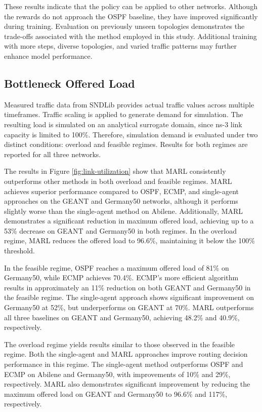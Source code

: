 These results indicate that the policy can be applied to other networks. Although the rewards do not approach the OSPF baseline, they have improved significantly during training. Evaluation on previously unseen topologies demonstrates the trade-offs associated with the method employed in this study. Additional training with more steps, diverse topologies, and varied traffic patterns may further enhance model performance.

\subsection{Bottleneck Offered Load}
\label{sec:res-util}

Measured traffic data from SNDLib \cite{SNDlib10} provides actual traffic values across multiple timeframes. Traffic scaling is applied to generate demand for simulation. The resulting load is simulated on an analytical surrogate domain, since ns-3 link capacity is limited to 100\%. Therefore, simulation demand is evaluated under two distinct conditions: overload and feasible regimes. Results for both regimes are reported for all three networks.

The results in Figure \ref{fig:link-utilization} show that MARL consistently outperforms other methods in both overload and feasible regimes. MARL achieves superior performance compared to OSPF, ECMP, and single-agent approaches on the GEANT and Germany50 networks, although it performs slightly worse than the single-agent method on Abilene. Additionally, MARL demonstrates a significant reduction in maximum offered load, achieving up to a 53\% decrease on GEANT and Germany50 in both regimes. In the overload regime, MARL reduces the offered load to 96.6\%, maintaining it below the 100\% threshold.

In the feasible regime, OSPF reaches a maximum offered load of 81\% on Germany50, while ECMP achieves 70.4\%. ECMP's more efficient algorithm results in approximately an 11\% reduction on both GEANT and Germany50 in the feasible regime. The single-agent approach shows significant improvement on Germany50 at 52\%, but underperforms on GEANT at 70\%. MARL outperforms all three baselines on GEANT and Germany50, achieving 48.2\% and 40.9\%, respectively.

The overload regime yields results similar to those observed in the feasible regime. Both the single-agent and MARL approaches improve routing decision performance in this regime. The single-agent method outperforms OSPF and ECMP on Abilene and Germany50, with improvements of 10\% and 29\%, respectively. MARL also demonstrates significant improvement by reducing the maximum offered load on GEANT and Germany50 to 96.6\% and 117\%, respectively.

